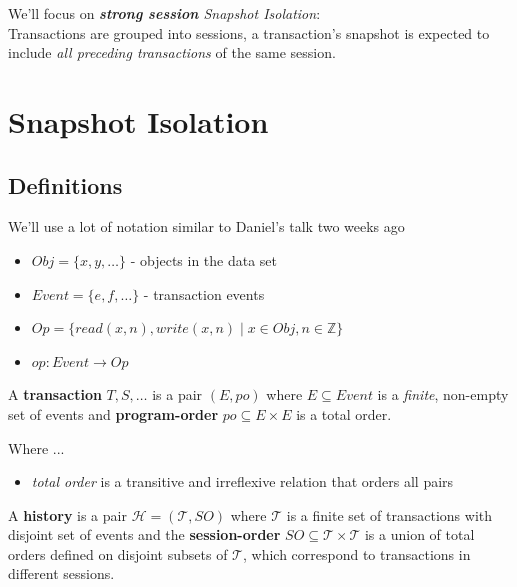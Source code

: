 \documentclass{beamer}
\begin{document}
\begin{frame}
	We'll focus on \textit{\textbf{strong session} Snapshot Isolation}: \\
	Transactions are grouped into sessions, a transaction's snapshot is expected to include \textit{all preceding transactions} of the same session.
\end{frame}

\section{Snapshot Isolation}
\subsection{Definitions}

\begin{frame}
	We'll use a lot of notation similar to Daniel's talk two weeks ago
	\begin{itemize}
		\item $ Obj =  \{ x, y, \dots \} $ - objects in the data set
		\item $ Event = \{ e, f, \dots \} $ - transaction events
		\item $ Op = \{ read(x,n), write(x, n) \mid x \in Obj, n \in \mathbb{Z}\} $ 
		\item $ op: Event \rightarrow Op $
	\end{itemize}
\end{frame}

\begin{frame}
	\begin{definition}
		A \textbf{transaction} $ T, S, \dots $ is a pair $ (E, po ) $ where $ E \subseteq Event $ is a \emph{finite}, non-empty set of events and \textbf{program-order} $ po \subseteq E \times E $ is a total order.
	\end{definition}
	Where ...
	\begin{itemize}
		\item \textit{total order} is a transitive and irreflexive relation that orders all pairs
	\end{itemize}
\end{frame}

\begin{frame}
	\begin{definition}
		A \textbf{history} is a pair $ \mathcal{H} = (\mathcal{T},SO) $ where $\mathcal{T}$ is a finite set of transactions with disjoint set of events and the \textbf{session-order} $ SO \subseteq \mathcal{T} \times \mathcal{T} $ is a union of total orders defined on disjoint subsets of $\mathcal{T}$, which correspond to transactions in different sessions.
	\end{definition}
\end{frame}
\end{document}
